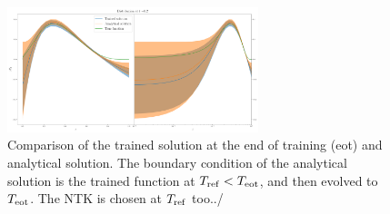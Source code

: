 \begin{figure}[t!]
  \centering
  \includegraphics[width=0.65\textwidth]{plots/xT3_2.png}
  \caption{Comparison of the trained solution at the end of training (eot) and analytical solution.
  The boundary condition of the analytical solution is the trained function at $T_{\rm ref} < T_{\rm eot}$,
  and then evolved to $T_{\rm eot}$. The NTK is chosen at $T_{\rm ref}$ too../}
\end{figure}
